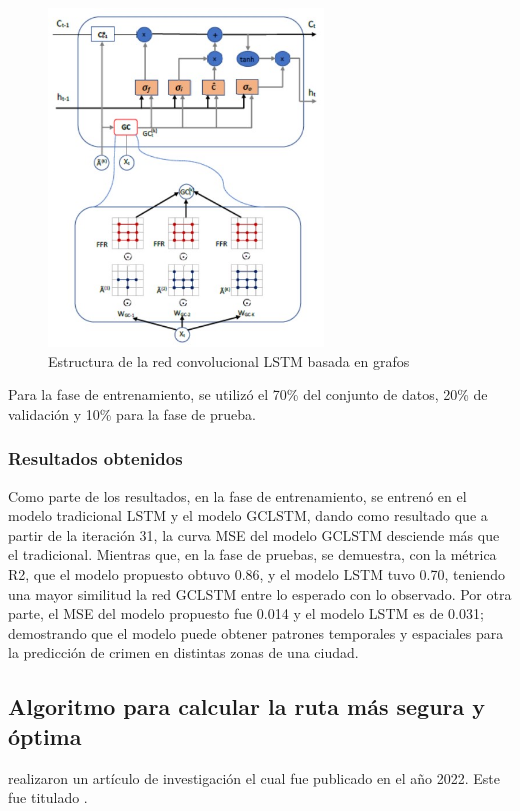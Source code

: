 
\begin{figure}[h]
	\begin{center}
		\includegraphics[width=0.65\textwidth]{2/figures/EsquivelRed.jpg}
		\caption{Estructura de la red convolucional LSTM basada en grafos}
		\label{1:fig2}
	\end{center}
\end{figure}

Para la fase de entrenamiento, se utilizó el 70\% del conjunto de datos, 20\% de validación y 10\% para la fase de prueba.

\subsubsection{Resultados obtenidos}
Como parte de los resultados, en la fase de entrenamiento, se entrenó en el modelo tradicional LSTM y el modelo GCLSTM, dando como resultado que a partir de la iteración 31, la curva MSE del modelo GCLSTM desciende más que el tradicional. 
Mientras que, en la fase de pruebas, se demuestra, con la métrica R2, que el modelo propuesto obtuvo 0.86, y el modelo LSTM tuvo 0.70, teniendo una mayor similitud la red GCLSTM entre lo esperado con lo observado. Por otra parte, el MSE del modelo propuesto fue 0.014 y el modelo LSTM es de 0.031; demostrando que el modelo puede obtener patrones temporales y espaciales para la predicción de crimen en distintas zonas de una ciudad. 

\subsection{Algoritmo para calcular la ruta más segura y óptima \citep*{pr_areiza}}
\citeauthor{pr_areiza} realizaron un artículo de investigación el cual fue publicado en el año 2022. Este fue titulado .


